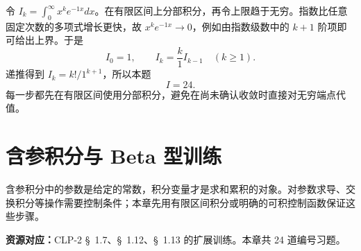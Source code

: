 \documentclass[UTF8,12pt,a4paper,fontset=fandol]{ctexart}
\begin{document}
\begin{solve}\label{ans:c19q25}
令 $I_k=\int_0^\infty x^ke^{-1x}dx$。在有限区间上分部积分，再令上限趋于无穷。指数比任意固定次数的多项式增长更快，故 $x^ke^{-1x}\to0$，例如由指数级数中的 $k+1$ 阶项即可给出上界。于是
\[
I_0=1,\qquad I_k=\frac k{1}I_{k-1}\quad(k\ge1).
\]
递推得到 $I_k=k!/1^{k+1}$，所以本题
\[
I=24.
\]
每一步都先在有限区间使用分部积分，避免在尚未确认收敛时直接对无穷端点代值。
\end{solve}

\clearpage
\section{含参积分与 Beta 型训练}\label{sec:ch20}
含参积分中的参数是给定的常数，积分变量才是求和累积的对象。对参数求导、交换积分等操作需要控制条件；本章先用有限区间积分或明确的可积控制函数保证这些步骤。

\textbf{资源对应：}CLP-2 \S~1.7、\S~1.12、\S~1.13 的扩展训练。本章共 24 道编号习题。
\end{document}
